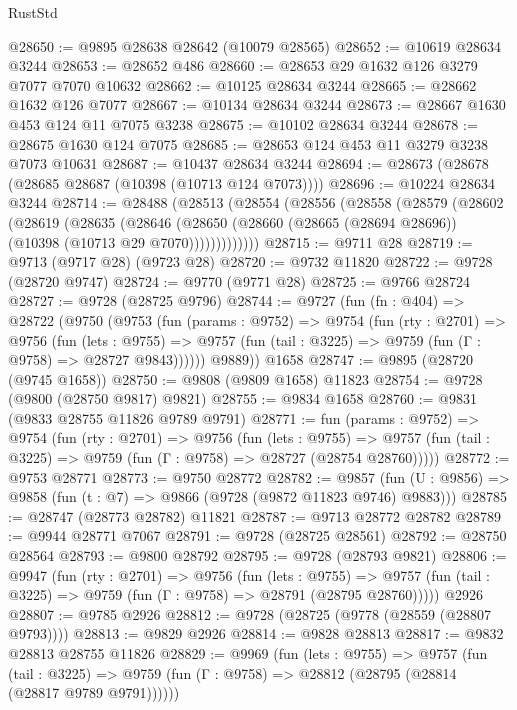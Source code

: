\begin{lexlean}{RustStd}
\begin{coremodule}
@28650 := @9895 @28638 @28642 (@10079 @28565)
@28652 := @10619 @28634 @3244
@28653 := @28652 @486
@28660 := @28653 @29 @1632 @126 @3279 @7077 @7070 @10632
@28662 := @10125 @28634 @3244
@28665 := @28662 @1632 @126 @7077
@28667 := @10134 @28634 @3244
@28673 := @28667 @1630 @453 @124 @11 @7075 @3238
@28675 := @10102 @28634 @3244
@28678 := @28675 @1630 @124 @7075
@28685 := @28653 @124 @453 @11 @3279 @3238 @7073 @10631
@28687 := @10437 @28634 @3244
@28694 := @28673 (@28678 (@28685 @28687 (@10398 (@10713 @124 @7073))))
@28696 := @10224 @28634 @3244
@28714 := @28488
    (@28513
      (@28554
        (@28556
          (@28558
            (@28579
              (@28602
                (@28619
                  (@28635
                    (@28646
                      (@28650
                        (@28660 (@28665 (@28694 @28696)) (@10398 (@10713 @29 @7070)))))))))))))
@28715 := @9711 @28
@28719 := @9713 (@9717 @28) (@9723 @28)
@28720 := @9732 @11820
@28722 := @9728 (@28720 @9747)
@28724 := @9770 (@9771 @28)
@28725 := @9766 @28724
@28727 := @9728 (@28725 @9796)
@28744 := @9727
    (fun (fn : @404) =>
    @28722
      (@9750
        (@9753
          (fun (params : @9752) =>
          @9754
            (fun (rty : @2701) =>
            @9756
              (fun (lets : @9755) =>
              @9757 (fun (tail : @3225) => @9759 (fun (Γ : @9758) => @28727 @9843))))))
        @9889))
    @1658
@28747 := @9895 (@28720 (@9745 @1658))
@28750 := @9808 (@9809 @1658) @11823
@28754 := @9728 (@9800 (@28750 @9817) @9821)
@28755 := @9834 @1658
@28760 := @9831 (@9833 @28755 @11826 @9789 @9791)
@28771 := fun (params : @9752) =>
  @9754
    (fun (rty : @2701) =>
    @9756
      (fun (lets : @9755) =>
      @9757 (fun (tail : @3225) => @9759 (fun (Γ : @9758) => @28727 (@28754 @28760)))))
@28772 := @9753 @28771
@28773 := @9750 @28772
@28782 := @9857
    (fun (U : @9856) => @9858 (fun (t : @7) => @9866 (@9728 (@9872 @11823 @9746) @9883)))
@28785 := @28747 (@28773 @28782) @11821
@28787 := @9713 @28772 @28782
@28789 := @9944 @28771 @7067
@28791 := @9728 (@28725 @28561)
@28792 := @28750 @28564
@28793 := @9800 @28792
@28795 := @9728 (@28793 @9821)
@28806 := @9947
    (fun (rty : @2701) =>
    @9756
      (fun (lets : @9755) =>
      @9757 (fun (tail : @3225) => @9759 (fun (Γ : @9758) => @28791 (@28795 @28760)))))
    @2926
@28807 := @9785 @2926
@28812 := @9728 (@28725 (@9778 (@28559 (@28807 @9793))))
@28813 := @9829 @2926
@28814 := @9828 @28813
@28817 := @9832 @28813 @28755 @11826
@28829 := @9969
    (fun (lets : @9755) =>
    @9757
      (fun (tail : @3225) =>
      @9759 (fun (Γ : @9758) => @28812 (@28795 (@28814 (@28817 @9789 @9791))))))

\end{coremodule}
\end{lexlean}
